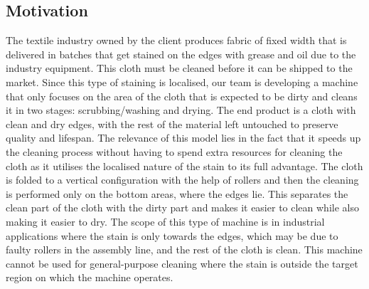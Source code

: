 \documentclass[table,french,english]{rapportCS}
\begin{document}
\newpage
\begin{center}
\section*{\centering Motivation}\label{sec:motivation}
The textile industry owned by the client produces fabric of fixed width that is delivered in batches that get stained on the edges with grease and oil due to the industry equipment. This cloth must be cleaned before it can be shipped to the market. Since this type of staining is localised, our team is developing a machine that only focuses on the area of the cloth that is expected to be dirty and cleans it in two stages: scrubbing/washing and drying. The end product is a cloth with clean and dry edges, with the rest of the material left untouched to preserve quality and lifespan. The relevance of this model lies in the fact that it speeds up the cleaning process without having to spend extra resources for cleaning the cloth as it utilises the localised nature of the stain to its full advantage. The cloth is folded to a vertical configuration with the help of rollers and then the cleaning is performed only on the bottom areas, where the edges lie. This separates the clean part of the cloth with the dirty part and makes it easier to clean while also making it easier to dry. The scope of this type of machine is in industrial applications where the stain is only towards the edges, which may be due to faulty rollers in the assembly line, and the rest of the cloth is clean. This machine cannot be used for general-purpose cleaning where the stain is outside the target region on which the machine operates.

\end{center}
\newpage
\end{document}
